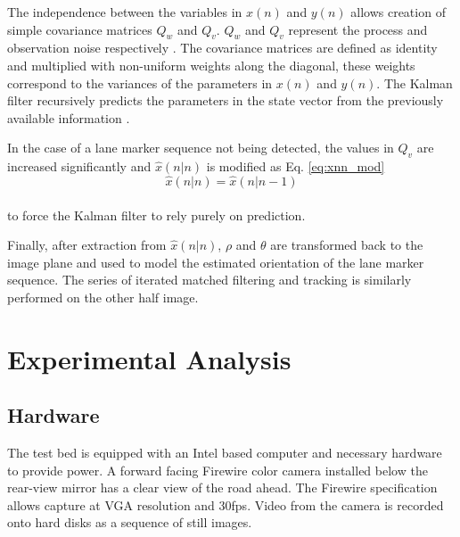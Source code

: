 \documentclass{article}
\begin{document}
The independence between the variables in $x(n)$ and $y(n)$ allows creation of simple covariance matrices $Q_w$ and $Q_v$. $Q_w$ and $Q_v$ represent the process and observation noise respectively \cite{hayes_statistical_1996}.
The covariance matrices are defined as identity and multiplied with non-uniform weights along the diagonal, these weights correspond to the variances of the parameters in $x(n)$ and $y(n)$. The Kalman filter recursively predicts the parameters in the state vector from the previously available information \cite{hayes_statistical_1996,brookner_tracking_1998}.

In the case of a lane marker sequence not being detected, the values in $Q_v$ are increased significantly and $\hat{x}(n|n)$ is modified as Eq. \ref{eq:xnn_mod}
\begin{equation}
\hat{x}(n|n) = \hat{x}(n|n-1)
\label{eq:xnn_mod}
\end{equation}\\
to force the Kalman filter to rely purely on prediction. 

Finally, after extraction from $\hat{x}(n|n)$, $\rho$ and $\theta$ are transformed back to the image plane and used to model the estimated orientation of the lane marker sequence. The series of iterated matched filtering and tracking is similarly performed on the other half image.

\section{Experimental Analysis}
\label{sec:exp_ana}
\subsection{Hardware}
The test bed is equipped with an Intel based computer and necessary hardware to provide power. A forward facing Firewire color camera installed below the rear-view mirror has a clear view of the road ahead. The Firewire specification allows capture at VGA resolution and 30fps. Video from the camera is recorded onto hard disks as a sequence of still images.
\end{document}
